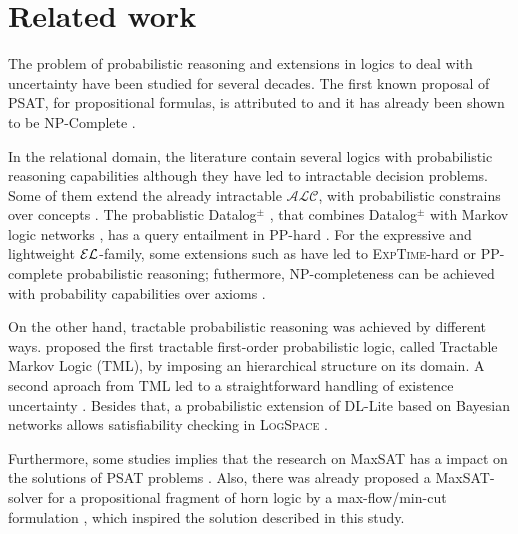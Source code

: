 
\chapter{Related work}
\label{cap:relatedwork}

The problem of probabilistic reasoning and extensions in logics to deal with uncertainty have been studied for several decades. The first known proposal of PSAT, for propositional formulas, is attributed to \citet{boole1854investigation} and it has already been shown to be NP-Complete \citep{georgakopoulos1988probabilistic}.

In the relational domain, the literature contain several logics with probabilistic reasoning capabilities although they have led to intractable decision problems.  Some of them extend the already intractable $\mathcal{ALC}$, with probabilistic constrains over concepts \citep{heinsohn1994probabilistic, lukasiewicz2008expressive, GutierrezBasultoEA11}. The probablistic Datalog$^\pm$ \citep{gottlob2013query}, that combines Datalog$^\pm$ with Markov logic networks \citep{richardson2006markov}, has a query entailment in PP-hard \citep{ceylan_datalog_compl_2016}. For the expressive and lightweight $\mathcal{EL}$-family, some extensions such as \citet{gutierrez2017probabilistic,ceylan2017bayesian} have led to \textsc{ExpTime}-hard or PP-complete probabilistic reasoning; futhermore, NP-completeness can be achieved with probability capabilities over axioms \citep{Fin2019b}.

On the other hand, tractable probabilistic reasoning was achieved by different ways. \citet{Domingos_Webb_2012} proposed the first tractable first-order probabilistic logic, called Tractable Markov Logic (TML), by imposing an hierarchical structure on its domain. A second aproach from TML led to a straightforward handling of existence uncertainty \citep{webb2013tractable}. Besides that, a probabilistic extension of DL-Lite based on Bayesian networks allows satisfiability checking in \textsc{LogSpace} \citep{damato_prob_dl_lite_2008}. 

Furthermore, some studies implies that the research on MaxSAT has a impact on the solutions of PSAT problems \citep{andersen2001easy}. Also, there was already proposed a MaxSAT-solver for a propositional fragment of horn logic by a max-flow/min-cut formulation \citep{jaumard1987complexity}, which inspired the solution described in this study.